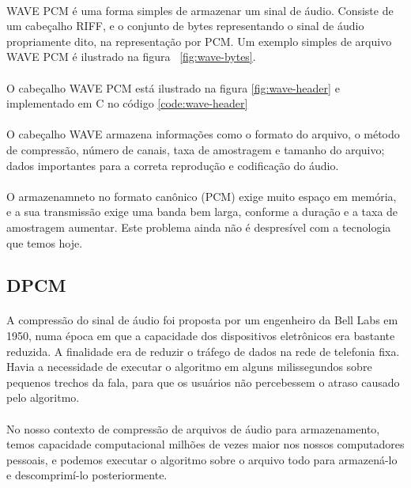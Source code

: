 \documentclass[a4paper,12pt]{article}
\begin{document}
\paragraph{}
WAVE PCM é uma forma simples de armazenar um sinal de áudio. Consiste de um cabeçalho RIFF, e o conjunto de bytes representando o sinal de áudio propriamente dito, na representação por PCM. Um exemplo simples de arquivo WAVE PCM é ilustrado na figura ~\ref{fig:wave-bytes}.

\paragraph{}
O cabeçalho WAVE PCM está ilustrado na figura \ref{fig:wave-header} e implementado em C no código \ref{code:wave-header}

\paragraph{}
O cabeçalho WAVE armazena informações como o formato do arquivo, o método de compressão, número de canais, taxa de amostragem e tamanho do arquivo; dados importantes para a correta reprodução e codificação do áudio.

\paragraph{}
O armazenamneto no formato canônico (PCM) exige muito espaço em memória, e a sua transmissão exige uma banda bem larga, conforme a duração e a taxa de amostragem aumentar. Este problema ainda não é despresível com a tecnologia que temos hoje.

\subsection{DPCM}

\paragraph{}
A compressão do sinal de áudio foi proposta por um engenheiro da Bell Labs em 1950\cite{Cutler-1950}, numa época em que a capacidade dos dispositivos eletrônicos era bastante reduzida. A finalidade era de reduzir o tráfego de dados na rede de telefonia fixa. Havia a necessidade de executar o algoritmo em alguns milissegundos sobre pequenos trechos da fala, para que os usuários não percebessem o atraso causado pelo algoritmo.

\paragraph{}
No nosso contexto de compressão de arquivos de áudio para armazenamento, temos capacidade computacional milhões de vezes maior nos nossos computadores pessoais, e podemos executar o algoritmo sobre o arquivo todo para armazená-lo e descomprimí-lo posteriormente.
\end{document}
